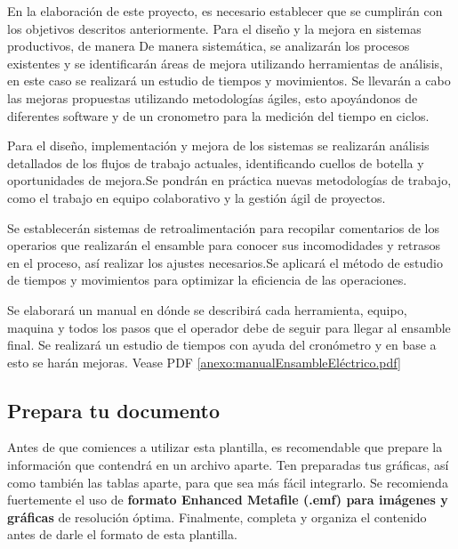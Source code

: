             En la elaboración de este proyecto, es necesario establecer que se cumplirán con los objetivos descritos anteriormente. Para el diseño y la mejora en sistemas productivos, de manera De manera sistemática, se analizarán los procesos existentes y se identificarán áreas de mejora utilizando herramientas de análisis, en este caso se realizará un estudio de tiempos y movimientos. Se llevarán a cabo las mejoras propuestas utilizando metodologías ágiles, esto apoyándonos de diferentes software y de un cronometro para la medición del tiempo en ciclos.
            
            
            Para el diseño, implementación y mejora de los sistemas se realizarán análisis detallados de los flujos de trabajo actuales, identificando cuellos de botella y oportunidades de mejora.Se pondrán en práctica nuevas metodologías de trabajo, como el trabajo en equipo colaborativo y la gestión ágil de proyectos.
            
            
            Se establecerán sistemas de retroalimentación para recopilar comentarios de los operarios que realizarán el ensamble para conocer sus incomodidades y retrasos en el proceso, así realizar los ajustes necesarios.Se aplicará el método de estudio de tiempos y movimientos para optimizar la eficiencia de las operaciones.
            
            Se elaborará un manual en dónde se describirá cada herramienta, equipo, maquina y todos los pasos que el operador debe de seguir para llegar al ensamble final. Se realizará un estudio de tiempos con ayuda del cronómetro y en base a esto se harán mejoras. Vease PDF \ref{anexo:manualEnsambleEléctrico.pdf}
            
            
            
            \subsection{Prepara tu documento}
            
            Antes de que comiences a utilizar esta plantilla, es recomendable que prepare la información que contendrá en un archivo aparte. 
            Ten preparadas tus gráficas, así como también las tablas aparte, para que sea más fácil integrarlo. 
            Se recomienda fuertemente el uso de \textbf{formato Enhanced Metafile (.emf) para imágenes y gráficas} de resolución óptima. 
            Finalmente, completa y organiza el contenido antes de darle el formato de esta plantilla. 
            
